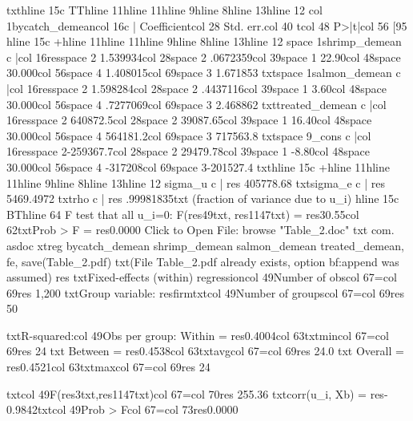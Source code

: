{txt}{hline 15}{c TT}{hline 11}{hline 11}{hline 9}{hline 8}{hline 13}{hline 12}
{col 1}bycatch_demean{col 16}{c |} Coefficient{col 28}  Std. err.{col 40}      t{col 48}   P>|t|{col 56}     [95%
{hline 15}{c +}{hline 11}{hline 11}{hline 9}{hline 8}{hline 13}{hline 12}
{space 1}shrimp_demean {c |}{col 16}{res}{space 2} 1.539934{col 28}{space 2} .0672359{col 39}{space 1}   22.90{col 48}{space 3}0.000{col 56}{space 4} 1.408015{col 69}{space 3} 1.671853
{txt}{space 1}salmon_demean {c |}{col 16}{res}{space 2} 1.598284{col 28}{space 2} .4437116{col 39}{space 1}    3.60{col 48}{space 3}0.000{col 56}{space 4} .7277069{col 69}{space 3} 2.468862
{txt}treated_demean {c |}{col 16}{res}{space 2} 640872.5{col 28}{space 2} 39087.65{col 39}{space 1}   16.40{col 48}{space 3}0.000{col 56}{space 4} 564181.2{col 69}{space 3} 717563.8
{txt}{space 9}_cons {c |}{col 16}{res}{space 2}-259367.7{col 28}{space 2} 29479.78{col 39}{space 1}   -8.80{col 48}{space 3}0.000{col 56}{space 4}  -317208{col 69}{space 3}-201527.4
{txt}{hline 15}{c +}{hline 11}{hline 11}{hline 9}{hline 8}{hline 13}{hline 12}
       sigma_u {c |} {res} 405778.68
       {txt}sigma_e {c |} {res} 5469.4972
           {txt}rho {c |} {res} .99981835{txt}   (fraction of variance due to u_i)
{hline 15}{c BT}{hline 64}
F test that all u_i=0: F({res}49{txt}, {res}1147{txt}) = {res}30.55{col 62}{txt}Prob > F = {res}0.0000
Click to Open File:  {browse "Table_2.doc"}
{txt}
{com}. asdoc xtreg bycatch_demean shrimp_demean salmon_demean treated_demean, fe, save(Table_2.pdf)
{txt}(File Table_2.pdf already exists, option {bf:append} was assumed)
{res}
{txt}Fixed-effects (within) regression{col 49}Number of obs{col 67}={col 69}{res}     1,200
{txt}Group variable: {res}firm{txt}{col 49}Number of groups{col 67}={col 69}{res}        50

{txt}R-squared:{col 49}Obs per group:
     Within  = {res}0.4004{col 63}{txt}min{col 67}={col 69}{res}        24
{txt}     Between = {res}0.4538{col 63}{txt}avg{col 67}={col 69}{res}      24.0
{txt}     Overall = {res}0.4521{col 63}{txt}max{col 67}={col 69}{res}        24

{txt}{col 49}F({res}3{txt},{res}1147{txt}){col 67}={col 70}{res}   255.36
{txt}corr(u_i, Xb) = {res}-0.9842{txt}{col 49}Prob > F{col 67}={col 73}{res}0.0000

